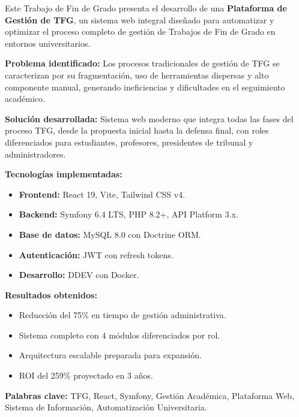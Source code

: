 Este Trabajo de Fin de Grado presenta el desarrollo de una \textbf{Plataforma 
de Gestión de TFG}, un sistema web integral diseñado para automatizar y 
optimizar el proceso completo de gestión de Trabajos de Fin de Grado en 
entornos universitarios.

\textbf{Problema identificado:} Los procesos tradicionales de gestión de TFG 
se caracterizan por su fragmentación, uso de herramientas dispersas y 
alto componente manual, generando ineficiencias y dificultades en el 
seguimiento académico.

\textbf{Solución desarrollada:} Sistema web moderno que integra todas las 
fases del proceso TFG, desde la propuesta inicial hasta la defensa final, 
con roles diferenciados para estudiantes, profesores, presidentes de 
tribunal y administradores.

\textbf{Tecnologías implementadas:}
\begin{itemize}
    \item \textbf{Frontend:} React 19, Vite, Tailwind CSS v4.
    \item \textbf{Backend:} Symfony 6.4 LTS, PHP 8.2+, API Platform 3.x.
    \item \textbf{Base de datos:} MySQL 8.0 con Doctrine ORM.
    \item \textbf{Autenticación:} JWT con refresh tokens.
    \item \textbf{Desarrollo:} DDEV con Docker.
\end{itemize}

\textbf{Resultados obtenidos:}
\begin{itemize}
    \item Reducción del 75\% en tiempo de gestión administrativa.
    \item Sistema completo con 4 módulos diferenciados por rol.
    \item Arquitectura escalable preparada para expansión.
    \item ROI del 259\% proyectado en 3 años.
\end{itemize}

\textbf{Palabras clave:} TFG, React, Symfony, Gestión Académica, Plataforma Web, 
Sistema de Información, Automatización Universitaria.
